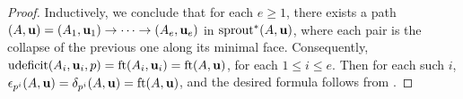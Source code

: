 \documentclass{amsart}
\begin{document}
\begin{proof}
Inductively, we conclude that for each $e\ge 1$, there exists a path $(A,\mathbf{u}) = (A_1,\mathbf{u}_1) \to \cdots \to (A_e,\mathbf{u}_e)$ in $\operatorname{sprout}^*(A,\mathbf{u})$, where each pair is the collapse of the previous one along its minimal face.
Consequently, $\operatorname{udeficit}(A_i,\mathbf{u}_i,p) = \operatorname{ft}(A_i, \mathbf{u}_i) = \operatorname{ft}(A, \mathbf{u})$, for each $1\le i \le e$.
Then for each such $i$, $\epsilon_{p^i}(A,\mathbf{u}) = \delta_{p^i}(A,\mathbf{u}) = \operatorname{ft}(A, \mathbf{u})$, and the desired formula follows from
.
%
%
%
%
%
%
%

\end{proof}
\end{document}
